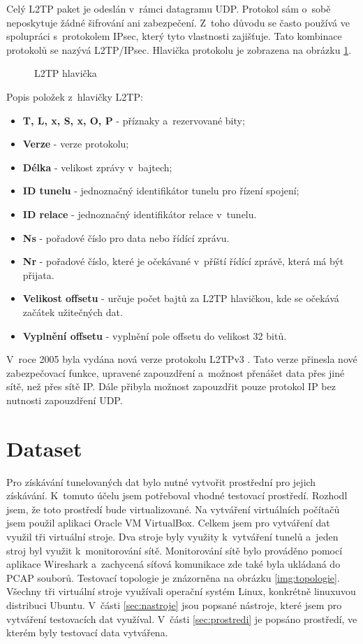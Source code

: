 Celý L2TP paket je odeslán v~rámci datagramu UDP. Protokol sám o~sobě neposkytuje žádné šifrování ani zabezpečení. Z~toho důvodu se často používá ve spolupráci s~protokolem IPsec, který tyto vlastnosti zajišťuje. Tato kombinace protokolů se nazývá L2TP/IPsec. Hlavička protokolu je zobrazena na obrázku \ref{img:l2tpv2}.

\begin{figure}[H]
    \centering
    \caption{L2TP hlavička}
    \label{img:l2tpv2}
\end{figure}

Popis položek z~hlavičky L2TP:

\begin{itemize}
    \item \textbf{T, L, x, S, x, O, P} - příznaky a~rezervované bity;
    \item \textbf{Verze} - verze protokolu;
    \item \textbf{Délka} - velikost zprávy v~bajtech;
    \item \textbf{ID tunelu} - jednoznačný identifikátor tunelu pro řízení spojení;
    \item \textbf{ID relace} - jednoznačný identifikátor relace v~tunelu.
    \item \textbf{Ns} - pořadové číslo pro data nebo řídící zprávu.
    \item \textbf{Nr} - pořadové číslo, které je očekávané v~příští řídící zprávě, která má být přijata.
    \item \textbf{Velikost offsetu} - určuje počet bajtů za L2TP hlavičkou, kde se očekává začátek užitečných dat.
    \item \textbf{Vyplnění offsetu} - vyplnění pole offsetu do velikost 32 bitů.
\end{itemize}

V~roce 2005 byla vydána nová verze protokolu L2TPv3 \cite{l2tpv3}. Tato verze přinesla nové zabezpečovací funkce, upravené zapouzdření a~možnost přenášet data přes jiné sítě, než přes sítě IP. Dále přibyla možnost zapouzdřit pouze protokol IP bez nutnosti zapouzdření UDP.

\chapter{Dataset}
\label{chap:dataset}
Pro získávání tunelovaných dat bylo nutné vytvořit prostřední pro jejich získávání. K~tomuto účelu jsem potřeboval vhodné testovací prostředí. Rozhodl jsem, že toto prostředí bude virtualizované. Na vytváření virtuálních počítačů jsem použil aplikaci Oracle VM VirtualBox. Celkem jsem pro vytváření dat využil tři virtuální stroje. Dva stroje byly využity k~vytváření tunelů a~jeden stroj byl využit k~monitorování sítě. Monitorování sítě bylo prováděno pomocí aplikace Wireshark a~zachycená síťová komunikace zde také byla ukládaná do PCAP souborů. Testovací topologie je znázorněna na obrázku \ref{img:topologie}. Všechny tři virtuální stroje využívali operační systém Linux, konkrétně linuxuvou distribuci Ubuntu. V~části \ref{sec:nastroje} jsou popsané nástroje, které jsem pro vytváření testovacích dat využíval. V~části \ref{sec:prostredi} je popsáno prostředí, ve kterém byly testovací data vytvářena.

